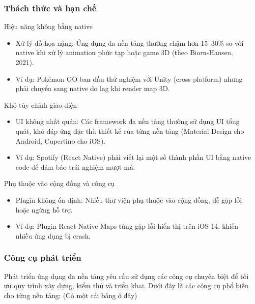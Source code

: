 \begin{flushleft}
  \subsubsection{Thách thức và hạn chế}
    \begin{flushleft}
      \hspace*{0.8cm}Hiệu năng không bằng native
      \setlength{\leftmargini}{1.5cm}
      \begin{itemize}
        \item Xử lý đồ họa nặng: Ứng dụng đa nền tảng thường chậm hơn 15–30\% so với native khi xử lý animation phức tạp hoặc game 3D (theo Biorn-Hansen, 2021).
        \item Ví dụ: Pokémon GO ban đầu thử nghiệm với Unity (cross-platform) nhưng phải chuyển sang native do lag khi render map 3D.
      \end{itemize}
    \end{flushleft}

    \begin{flushleft}
      \hspace*{0.8cm}Khó tùy chỉnh giao diện
      \setlength{\leftmargini}{1.5cm}
      \begin{itemize}
          \item UI không nhất quán: Các framework đa nền tảng thường sử dụng UI tổng quát, khó đáp ứng đặc thù thiết kế của từng nền tảng (Material Design cho Android, Cupertino cho iOS).
          \item Ví dụ: Spotify (React Native) phải viết lại một số thành phần UI bằng native code để đảm bảo trải nghiệm mượt mà.
      \end{itemize}
    \end{flushleft}

    \begin{flushleft}
      \hspace*{0.8cm}Phụ thuộc vào cộng đồng và công cụ
      \setlength{\leftmargini}{1.5cm}
      \begin{itemize}
          \item Plugin không ổn định: Nhiều thư viện phụ thuộc vào cộng đồng, dễ gặp lỗi hoặc ngừng hỗ trợ.
          \item Ví dụ: Plugin React Native Maps từng gặp lỗi hiển thị trên iOS 14, khiến nhiều ứng dụng bị crash.
      \end{itemize}
    \end{flushleft}

  \subsubsection{Công cụ phát triển}
    \begin{flushleft}
      \hspace*{0.8cm}Phát triển ứng dụng đa nền tảng yêu cầu sử dụng các công cụ chuyên biệt để tối ưu quy trình xây dựng, kiểm thử và triển khai. Dưới đây là các công cụ phổ biến cho từng nền tảng: (Có một cái bảng ở đây)
    \end{flushleft}


\end{flushleft}
